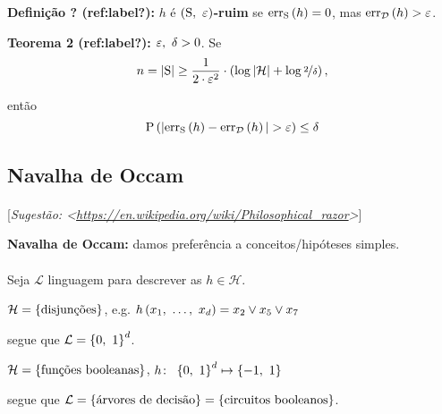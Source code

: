 \textbf{Definição ? (ref:label?):} $h$ é \textbf{$\left(\mathrm{S},\ \eps\vphantom{1j}\right)$-ruim} se $\mathrm{err}_\mathrm{S}\left(h\vphantom{1j}\right)=0$, mas $\mathrm{err}_\mathcal{D}\left(h\vphantom{1j}\right)>\varepsilon$.

\textbf{Teorema 2 (ref:label?):} $\varepsilon,\ \delta>0$. Se
\[
  n = \left|\mathrm{S}\vphantom{1j}\right| \geq \frac{1}{2\cdot\varepsilon^2}\cdot\left(\log\left|\mathcal{H}\vphantom{1j}\right| + \log\nicefrac{2}{\delta}\vphantom{1j}\right),
\]

então
\[
  \mathrm{P}\left(\left|\mathrm{err}_\mathrm{S}\left(h\vphantom{1j}\right)-\mathrm{err}_\mathcal{D}\left(h\vphantom{1j}\right)\vphantom{1j}\right| > \varepsilon\vphantom{1j}\right) \leq \delta
\]

\clearpage
\subsection{Navalha de Occam}

\paragraph{\nopunct}[\textit{Sugestão: <\href{https://en.wikipedia.org/wiki/Philosophical\_razor}{https://en.wikipedia.org/wiki/Philosophical\_razor}>}]

\begin{afirmacao}
  \label{afr:navalha_de_occam}
  \normalfont
  \textbf{Navalha de Occam:} damos preferência a conceitos/hipóteses simples.
\end{afirmacao}

\paragraph{\nopunct} Seja $\mathcal{L}$ linguagem para descrever as $h\in\mathcal{H}$.

\begin{exemplo}
  $\mathcal{H}=\left\{\text{disjunções}\vphantom{1j}\right\}$, e.g. $h\left(x_1,\ \ldots,\ x_d\vphantom{1j}\right)=x_2\lor x_5\lor x_7$
  
  segue que $\mathcal{L}=\left\{0,\ 1\vphantom{1j}\right\}^d$.
\end{exemplo}

\begin{exemplo}
  $\mathcal{H}=\left\{\text{funções booleanas}\vphantom{1j}\right\}$, $h\colon\ \left\{0,\ 1\vphantom{1j}\right\}^d\mapsto\left\{-1,\ 1\vphantom{1j}\right\}$
  
  segue que $\mathcal{L}=\left\{\text{árvores de decisão}\vphantom{1j}\right\}=\left\{\text{circuitos booleanos}\vphantom{1j}\right\}$.
\end{exemplo}

